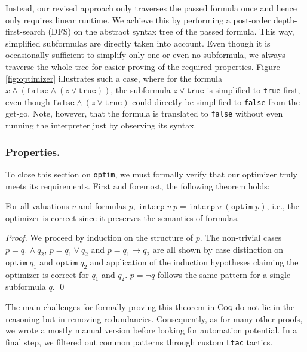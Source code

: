Instead, our revised approach only traverses the passed formula once and hence only requires linear runtime.
We achieve this by performing a post-order depth-first-search (DFS) on the abstract syntax tree of the passed formula.
This way, simplified subformulas are directly taken into account.
Even though it is occasionally sufficient to simplify only one or even no subformula, we always traverse the whole tree for easier proving of the required properties.
Figure \ref{fig:optimizer} illustrates such a case, where for the formula $x \land (\texttt{false} \land (z \lor \texttt{true}))$, the subformula $z \lor \texttt{true}$ is simplified to \texttt{true} first, even though $\texttt{false} \land (z \lor \texttt{true})$ could directly be simplified to \texttt{false} from the get-go.
Note, however, that the formula is translated to \texttt{false} without even running the interpreter just by observing its syntax.

\subsubsection{Properties.}

To close this section on \texttt{optim}, we must formally verify that our optimizer truly meets its requirements.
First and foremost, the following theorem holds:
\begin{theorem}
    For all valuations $v$ and formulas $p$, $\texttt{interp}\;v\;p = \texttt{interp}\;v\;(\texttt{optim}\;p)$, i.e., the optimizer is correct since it preserves the semantics of formulas.
\end{theorem}
\begin{proof}
    We proceed by induction on the structure of $p$. 
    The non-trivial cases $p = q_1 \land q_2$, $p = q_1 \lor q_2$ and $p = q_1 \rightarrow q_2$ are all shown by case distinction on $\texttt{optim}\;q_1$ and $\texttt{optim}\;q_2$ and application of the induction hypotheses claiming the optimizer is correct for $q_1$ and $q_2$.
    $p = \neg q$ follows the same pattern for a single subformula $q$. \qed
\end{proof}
The main challenges for formally proving this theorem in \textsc{Coq} do not lie in the reasoning but in removing redundancies.
Consequently, as for many other proofs, we wrote a mostly manual version before looking for automation potential.
In a final step, we filtered out common patterns through custom \texttt{Ltac} tactics. 

